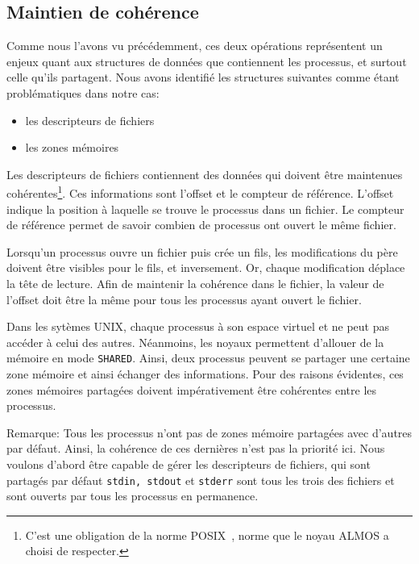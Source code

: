     \subsection{Maintien de cohérence}

      Comme nous l'avons vu précédemment, ces deux opérations représentent un
      enjeux quant aux structures de données que contiennent les processus, et
      surtout celle qu'ils partagent. Nous avons identifié les structures
      suivantes comme étant problématiques dans notre cas:
      \begin{itemize}
      \item les descripteurs de fichiers
      \item les zones mémoires
      \end{itemize}

      Les descripteurs de fichiers contiennent des données qui doivent être
      maintenues cohérentes\footnote{C'est une obligation de la norme
        POSIX~\citep{posix2013}, norme que le noyau ALMOS a choisi de
        respecter.}. Ces informations sont l'offset et le compteur de
      référence. L'offset indique la position à laquelle se trouve le processus
      dans un fichier. Le compteur de référence permet de savoir combien de
      processus ont ouvert le même fichier.

      Lorsqu'un processus ouvre un fichier puis crée un fils, les modifications
      du père doivent être visibles pour le fils, et inversement. Or, chaque
      modification déplace la tête de lecture. Afin de maintenir la cohérence
      dans le fichier, la valeur de l'offset doit être la même pour tous les
      processus ayant ouvert le fichier.

      Dans les sytèmes UNIX, chaque processus à son espace virtuel et ne peut
      pas accéder à celui des autres. Néanmoins, les noyaux permettent d'allouer
      de la mémoire en mode \texttt{SHARED}. Ainsi, deux processus peuvent se
      partager une certaine zone mémoire et ainsi échanger des
      informations. Pour des raisons évidentes, ces zones mémoires partagées
      doivent impérativement être cohérentes entre les processus.

      \begin{paragraph}{Remarque:}
        Tous les processus n'ont pas de zones mémoire partagées avec d'autres
        par défaut. Ainsi, la cohérence de ces dernières n'est pas la priorité
        ici. Nous voulons d'abord être capable de gérer les descripteurs de
        fichiers, qui sont partagés par défaut \texttt{stdin, stdout} et
        \texttt{stderr} sont tous les trois des fichiers et sont ouverts par
        tous les processus en permanence.
      \end{paragraph}


